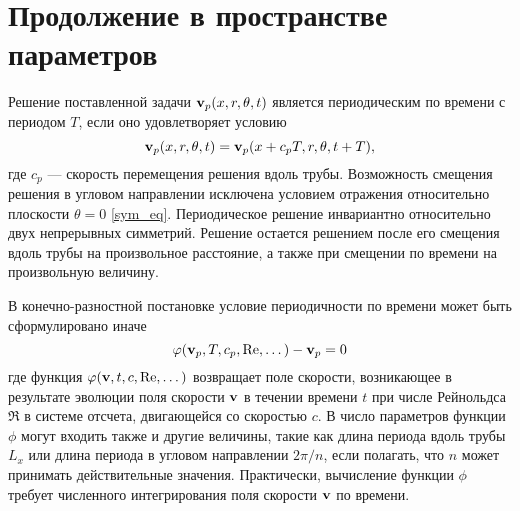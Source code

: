 \begin{comment}
На каждом шаге метода Ньютона-Рафсона возникает необходимость решения матрицы Якоби. В случае задач вычислительной гидродинамики, где число неизвестных достигает миллионов, формирование и даже хранение матрицы Якоби в явном виде невозможно, так как число элементов в ней составляет квадрат числа неизвестных в уравнении. Используя Крыловские методы для решения матрицы Якоби удается радикальным образом сократить число операций и необходимой оперативной памяти, что делает расчеты возможными. В работе реализован метод Ньютона-Крылова \cite{}, основанный на методе GMRES (generalized minimum residual method) \cite{Saad1986}. Альтернативой методу GMRES может быть метод BiCGSTAB (Biconjugate gradient stabilized method) \cite{Sleijpen1993}. 

В континуальной постановке не формулируется. 
\end{comment}

\section{Продолжение в пространстве параметров}

Решение поставленной задачи $\mathbf{v}_p(x,r,\theta,t)$ является периодическим по времени с периодом $T$, если оно удовлетворяет условию
\begin{equation}
\mathbf{v}_p(x,r,\theta,t) = \mathbf{v}_p(x + c_p T, r, \theta, t + T),
\end{equation}
где $c_p$ --- скорость перемещения решения вдоль трубы. Возможность смещения решения в угловом направлении исключена условием отражения относительно плоскости $\theta = 0$ \eqref{sym_eq}. Периодическое решение инвариантно относительно двух непрерывных симметрий. Решение остается решением после его смещения вдоль трубы на произвольное расстояние, а также при смещении по времени на произвольную величину. 

В конечно-разностной постановке условие периодичности по времени может быть сформулировано иначе
\begin{equation}\label{P_eq}
\varphi(\mathbf{v}_p, T, c_p, \operatorname{Re}, \dots) - \mathbf{v}_p = 0
\end{equation}
где функция $\varphi(\mathbf{v}, t, c, \operatorname{Re}, \dots)$ возвращает поле скорости, возникающее в результате эволюции поля скорости $\mathbf{v}$ в течении времени $t$ при числе Рейнольдса $\Re$ в системе отсчета, двигающейся со скоростью $c$. В число параметров функции $\phi$ могут входить также и другие величины, такие как длина периода вдоль трубы $L_x$ или длина периода в угловом направлении $2\pi/n$, если полагать, что $n$ может принимать действительные значения. Практически, вычисление функции $\phi$ требует численного интегрирования поля скорости $\mathbf{v}$ по времени. 

